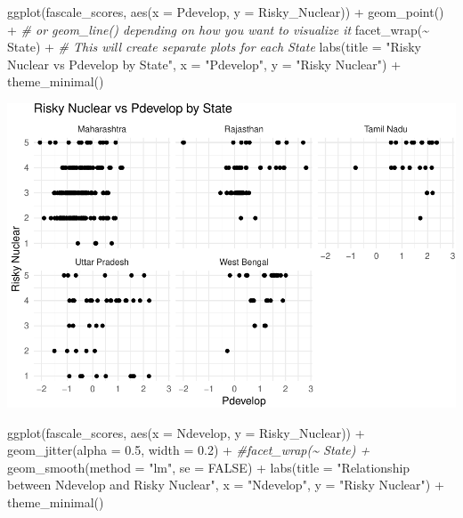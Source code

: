 \documentclass[
]{article}
\newenvironment{Shaded}{\begin{snugshade}}{\end{snugshade}}
\newcommand{\AttributeTok}[1]{\textcolor[rgb]{0.77,0.63,0.00}{#1}}
\newcommand{\CommentTok}[1]{\textcolor[rgb]{0.56,0.35,0.01}{\textit{#1}}}
\newcommand{\ConstantTok}[1]{\textcolor[rgb]{0.00,0.00,0.00}{#1}}
\newcommand{\FloatTok}[1]{\textcolor[rgb]{0.00,0.00,0.81}{#1}}
\newcommand{\FunctionTok}[1]{\textcolor[rgb]{0.00,0.00,0.00}{#1}}
\newcommand{\NormalTok}[1]{#1}
\newcommand{\SpecialCharTok}[1]{\textcolor[rgb]{0.00,0.00,0.00}{#1}}
\newcommand{\StringTok}[1]{\textcolor[rgb]{0.31,0.60,0.02}{#1}}
\begin{document}
\begin{Shaded}
\begin{Highlighting}[]
\FunctionTok{ggplot}\NormalTok{(fascale\_scores, }\FunctionTok{aes}\NormalTok{(}\AttributeTok{x =}\NormalTok{ Pdevelop, }\AttributeTok{y =}\NormalTok{ Risky\_Nuclear)) }\SpecialCharTok{+}
  \FunctionTok{geom\_point}\NormalTok{() }\SpecialCharTok{+}  \CommentTok{\# or geom\_line() depending on how you want to visualize it}
  \FunctionTok{facet\_wrap}\NormalTok{(}\SpecialCharTok{\textasciitilde{}}\NormalTok{ State) }\SpecialCharTok{+}  \CommentTok{\# This will create separate plots for each State}
  \FunctionTok{labs}\NormalTok{(}\AttributeTok{title =} \StringTok{"Risky Nuclear vs Pdevelop by State"}\NormalTok{,}
       \AttributeTok{x =} \StringTok{"Pdevelop"}\NormalTok{,}
       \AttributeTok{y =} \StringTok{"Risky Nuclear"}\NormalTok{) }\SpecialCharTok{+}
  \FunctionTok{theme\_minimal}\NormalTok{()}
\end{Highlighting}
\end{Shaded}

\includegraphics{Paper1_files/figure-latex/unnamed-chunk-25-1.pdf}

\begin{Shaded}
\begin{Highlighting}[]
\FunctionTok{ggplot}\NormalTok{(fascale\_scores, }\FunctionTok{aes}\NormalTok{(}\AttributeTok{x =}\NormalTok{ Ndevelop, }\AttributeTok{y =}\NormalTok{ Risky\_Nuclear)) }\SpecialCharTok{+}
  \FunctionTok{geom\_jitter}\NormalTok{(}\AttributeTok{alpha =} \FloatTok{0.5}\NormalTok{, }\AttributeTok{width =} \FloatTok{0.2}\NormalTok{) }\SpecialCharTok{+}
  \CommentTok{\#facet\_wrap(\textasciitilde{} State) +}
  \FunctionTok{geom\_smooth}\NormalTok{(}\AttributeTok{method =} \StringTok{"lm"}\NormalTok{, }\AttributeTok{se =} \ConstantTok{FALSE}\NormalTok{) }\SpecialCharTok{+}
  \FunctionTok{labs}\NormalTok{(}\AttributeTok{title =} \StringTok{"Relationship between Ndevelop and Risky Nuclear"}\NormalTok{,}
       \AttributeTok{x =} \StringTok{"Ndevelop"}\NormalTok{,}
       \AttributeTok{y =} \StringTok{"Risky Nuclear"}\NormalTok{) }\SpecialCharTok{+}
  \FunctionTok{theme\_minimal}\NormalTok{()}
\end{Highlighting}
\end{Shaded}
\end{document}
